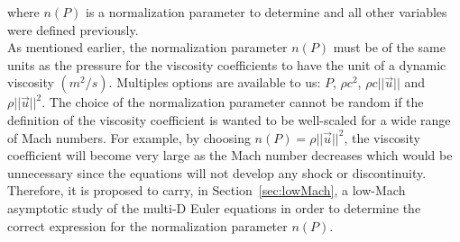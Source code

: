 \documentclass[preprint,10pt]{elsarticle}
\newcommand{\sct}[1]{Section~\ref{#1}}                   %
\begin{document}
where $n(P)$ is a normalization parameter to determine and all other variables were defined previously. \\
As mentioned earlier, the normalization parameter $n(P)$ must be of the same units as the pressure for the viscosity coefficients to have the unit of a dynamic viscosity $(m^2 / s)$. Multiples options are available to us: $P$, $\rho c^2$, $\rho c || \vec{u} ||$ and $\rho || \vec{u} ||^2$. The choice of the normalization parameter cannot be random if the definition of the viscosity coefficient is wanted to be well-scaled for a wide range of Mach numbers. For example, by choosing $n(P) = \rho || \vec{u} ||^2$, the viscosity coefficient will become very large as the Mach number decreases which would be unnecessary since the equations will not develop any shock or discontinuity. Therefore, it is proposed to carry, in \sct{sec:lowMach}, a low-Mach asymptotic study of the multi-D Euler equations in order to determine the correct expression for the normalization parameter $n(P)$.
\end{document}
